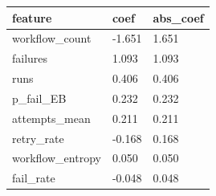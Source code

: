 \begin{table}[t]
\centering
\begin{tabular}{lll}
\hline
feature & coef & abs_coef \\
\hline
workflow_count & -1.651 & 1.651 \\
failures & 1.093 & 1.093 \\
runs & 0.406 & 0.406 \\
p_fail_EB & 0.232 & 0.232 \\
attempts_mean & 0.211 & 0.211 \\
retry_rate & -0.168 & 0.168 \\
workflow_entropy & 0.050 & 0.050 \\
fail_rate & -0.048 & 0.048 \\
\hline
\end{tabular}
\end{table}